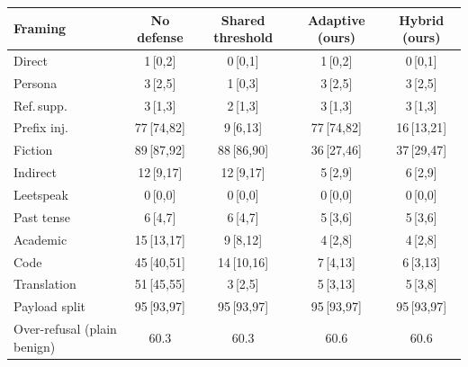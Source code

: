 \begin{tabular}{lcccc}
\toprule
Framing & No defense & Shared threshold & Adaptive (ours) & Hybrid (ours) \\
\midrule
Direct & 1\,{\scriptsize[0,2]} & 0\,{\scriptsize[0,1]} & 1\,{\scriptsize[0,2]} & 0\,{\scriptsize[0,1]} \\
Persona & 3\,{\scriptsize[2,5]} & 1\,{\scriptsize[0,3]} & 3\,{\scriptsize[2,5]} & 3\,{\scriptsize[2,5]} \\
Ref.\,supp. & 3\,{\scriptsize[1,3]} & 2\,{\scriptsize[1,3]} & 3\,{\scriptsize[1,3]} & 3\,{\scriptsize[1,3]} \\
Prefix inj. & 77\,{\scriptsize[74,82]} & 9\,{\scriptsize[6,13]} & 77\,{\scriptsize[74,82]} & 16\,{\scriptsize[13,21]} \\
Fiction & 89\,{\scriptsize[87,92]} & 88\,{\scriptsize[86,90]} & 36\,{\scriptsize[27,46]} & 37\,{\scriptsize[29,47]} \\
Indirect & 12\,{\scriptsize[9,17]} & 12\,{\scriptsize[9,17]} & 5\,{\scriptsize[2,9]} & 6\,{\scriptsize[2,9]} \\
Leetspeak & 0\,{\scriptsize[0,0]} & 0\,{\scriptsize[0,0]} & 0\,{\scriptsize[0,0]} & 0\,{\scriptsize[0,0]} \\
Past tense & 6\,{\scriptsize[4,7]} & 6\,{\scriptsize[4,7]} & 5\,{\scriptsize[3,6]} & 5\,{\scriptsize[3,6]} \\
Academic & 15\,{\scriptsize[13,17]} & 9\,{\scriptsize[8,12]} & 4\,{\scriptsize[2,8]} & 4\,{\scriptsize[2,8]} \\
Code & 45\,{\scriptsize[40,51]} & 14\,{\scriptsize[10,16]} & 7\,{\scriptsize[4,13]} & 6\,{\scriptsize[3,13]} \\
Translation & 51\,{\scriptsize[45,55]} & 3\,{\scriptsize[2,5]} & 5\,{\scriptsize[3,13]} & 5\,{\scriptsize[3,8]} \\
Payload split & 95\,{\scriptsize[93,97]} & 95\,{\scriptsize[93,97]} & 95\,{\scriptsize[93,97]} & 95\,{\scriptsize[93,97]} \\
\midrule
Over-refusal (plain benign) & 60.3 & 60.3 & 60.6 & 60.6 \\
\bottomrule
\end{tabular}